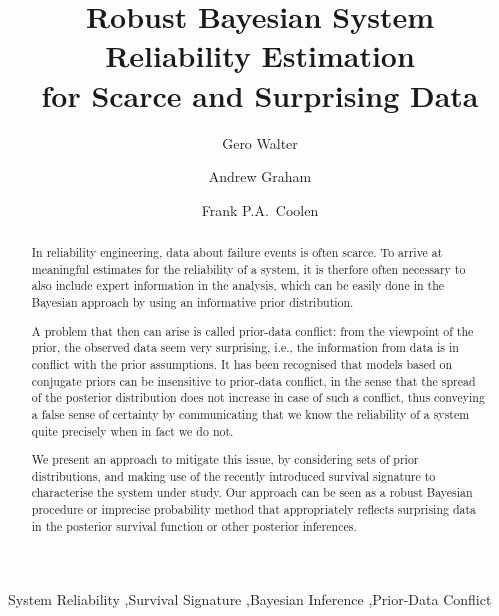 \documentclass[authoryear]{elsarticle}
\begin{document}
\begin{frontmatter}

\title{Robust Bayesian System Reliability Estimation\\ for Scarce and Surprising Data}

\author[eindh]{Gero Walter}
\author[durham]{Andrew Graham}
\author[durham]{Frank P.A.~Coolen}

\address[eindh]{School of Industrial Engineering, TU Eindhoven, Eindhoven, NL}
\address[durham]{Department of Mathematical Sciences, Durham University, Durham, UK}


\begin{abstract}
In reliability engineering, data about failure events is often scarce.
To arrive at meaningful estimates for the reliability of a system,
it is therfore often necessary to also include expert information in the analysis,
which can be easily done in the Bayesian approach by using an informative prior distribution.

A problem that then can arise is called prior-data conflict:
from the viewpoint of the prior, the observed data seem very surprising,
i.e., the information from data is in conflict with the prior assumptions.
It has been recognised that models based on conjugate priors can be insensitive to prior-data conflict,
in the sense that the spread of the posterior distribution does not increase in case of such a conflict,
thus conveying a false sense of certainty by communicating that we know the reliability of a system quite precisely when in fact we do not.

We present an approach to mitigate this issue, by considering sets of prior distributions,
and making use of the recently introduced survival signature to characterise the system under study.
Our approach can be seen as a robust Bayesian procedure or imprecise probability method
that appropriately reflects surprising data in the posterior survival function or other posterior inferences.
\end{abstract}

\begin{keyword}
System Reliability \sep Survival Signature \sep Bayesian Inference \sep Prior-Data Conflict
\end{keyword}

\end{frontmatter}

\end{document}
